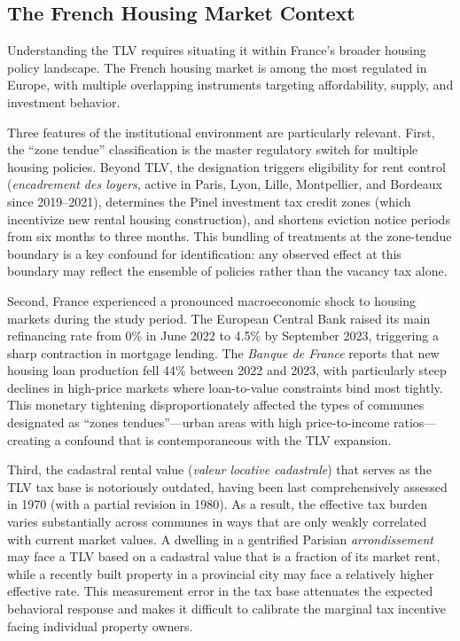 \documentclass[12pt]{article}
\begin{document}
\subsection{The French Housing Market Context}

Understanding the TLV requires situating it within France's broader housing policy landscape. The French housing market is among the most regulated in Europe, with multiple overlapping instruments targeting affordability, supply, and investment behavior.

Three features of the institutional environment are particularly relevant. First, the ``zone tendue'' classification is the master regulatory switch for multiple housing policies. Beyond TLV, the designation triggers eligibility for rent control (\textit{encadrement des loyers}, active in Paris, Lyon, Lille, Montpellier, and Bordeaux since 2019--2021), determines the Pinel investment tax credit zones (which incentivize new rental housing construction), and shortens eviction notice periods from six months to three months. This bundling of treatments at the zone-tendue boundary is a key confound for identification: any observed effect at this boundary may reflect the ensemble of policies rather than the vacancy tax alone.

Second, France experienced a pronounced macroeconomic shock to housing markets during the study period. The European Central Bank raised its main refinancing rate from 0\% in June 2022 to 4.5\% by September 2023, triggering a sharp contraction in mortgage lending. The \textit{Banque de France} reports that new housing loan production fell 44\% between 2022 and 2023, with particularly steep declines in high-price markets where loan-to-value constraints bind most tightly. This monetary tightening disproportionately affected the types of communes designated as ``zones tendues''---urban areas with high price-to-income ratios---creating a confound that is contemporaneous with the TLV expansion.

Third, the cadastral rental value (\textit{valeur locative cadastrale}) that serves as the TLV tax base is notoriously outdated, having been last comprehensively assessed in 1970 (with a partial revision in 1980). As a result, the effective tax burden varies substantially across communes in ways that are only weakly correlated with current market values. A dwelling in a gentrified Parisian \textit{arrondissement} may face a TLV based on a cadastral value that is a fraction of its market rent, while a recently built property in a provincial city may face a relatively higher effective rate. This measurement error in the tax base attenuates the expected behavioral response and makes it difficult to calibrate the marginal tax incentive facing individual property owners.
\end{document}
